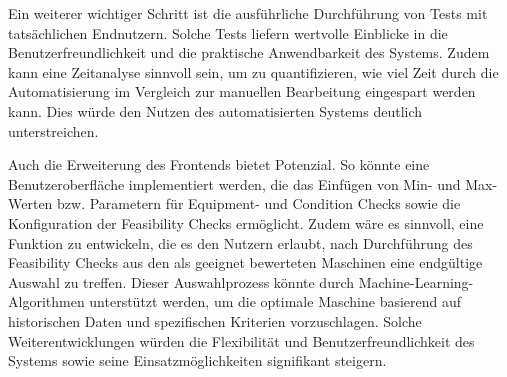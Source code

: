 Ein weiterer wichtiger Schritt ist die ausführliche Durchführung von Tests mit tatsächlichen Endnutzern. Solche Tests liefern wertvolle Einblicke in die Benutzerfreundlichkeit und die praktische Anwendbarkeit des Systems. Zudem kann eine Zeitanalyse sinnvoll sein, um zu quantifizieren, wie viel Zeit durch die Automatisierung im Vergleich zur manuellen Bearbeitung eingespart werden kann. Dies würde den Nutzen des automatisierten Systems deutlich unterstreichen.

Auch die Erweiterung des Frontends bietet Potenzial. So könnte eine Benutzeroberfläche implementiert werden, die das Einfügen von Min- und Max-Werten bzw. Parametern für Equipment- und Condition Checks sowie die Konfiguration der Feasibility Checks ermöglicht. Zudem wäre es sinnvoll, eine Funktion zu entwickeln, die es den Nutzern erlaubt, nach Durchführung des Feasibility Checks aus den als geeignet bewerteten Maschinen eine endgültige Auswahl zu treffen. Dieser Auswahlprozess könnte durch Machine-Learning-Algorithmen unterstützt werden, um die optimale Maschine basierend auf historischen Daten und spezifischen Kriterien vorzuschlagen. Solche Weiterentwicklungen würden die Flexibilität und Benutzerfreundlichkeit des Systems sowie seine Einsatzmöglichkeiten signifikant steigern.
